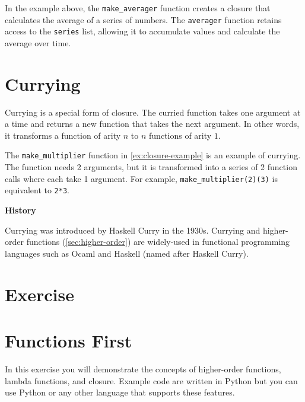 \documentclass[oneside,11pt,dvipsnames]{book}
\newenvironment{historybox}[1][]{
  \small
  \begin{myhistorybox}
    {\small \textbf{#1}}
  }{
  \end{myhistorybox}
}
\newcommand{\code}[1]{\texttt{#1}}
\begin{document}
In the example above, the \code{make\_averager} function creates a closure that calculates the average of a series of numbers. The \code{averager} function retains access to the \code{series} list, allowing it to accumulate values and calculate the average over time.









\section{Currying}\label{sec:curry}

Currying is a special form of closure. The curried function takes one argument at a time and returns a new function that takes the next argument. In other words, it transforms a function of arity $n$ to $n$ functions of arity $1$.

The \code{make\_multiplier} function in \autoref{ex:closure-example} is an example of currying. The function needs 2 arguments, but it is transformed into a series of 2 function calls where each take 1 argument. For example, \code{make\_multiplier(2)(3)} is equivalent to \code{2*3}.


\begin{historybox}[History] 
    Currying was introduced by Haskell Curry in the 1930s. Currying and higher-order functions (\autoref{sec:higher-order}) are widely-used in functional programming languages such as Ocaml and Haskell (named after Haskell Curry).
\end{historybox}

\section{Exercise}

\section{Functions First}\label{exercise:functions-first}

In this exercise you will demonstrate the concepts of higher-order functions, lambda functions, and closure. Example code are written in Python but you can use Python or any other language that supports these features.
\end{document}
